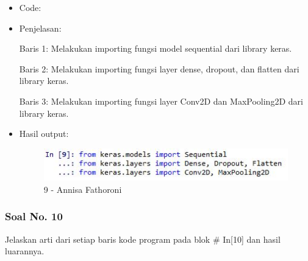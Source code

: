 \begin{itemize}
\item Code:


\item Penjelasan:

Baris 1: Melakukan importing fungsi model sequential dari library keras.

Baris 2: Melakukan importing fungsi layer dense, dropout, dan flatten dari library keras.

Baris 3: Melakukan importing fungsi layer Conv2D dan MaxPooling2D dari library keras.

\item Hasil output:

\begin{figure}[!hbtp]
\centering
\includegraphics[scale=0.7]{figures/Chapter 7/1164067/Praktek/Chapter7AnnisaFathoroni9.jpg}
\caption{9 - Annisa Fathoroni}
\label{9 - Annisa Fathoroni}
\end{figure}

\end{itemize}

\subsubsection{Soal No. 10}
Jelaskan arti dari setiap baris kode program pada blok \# In[10] dan hasil luarannya.

